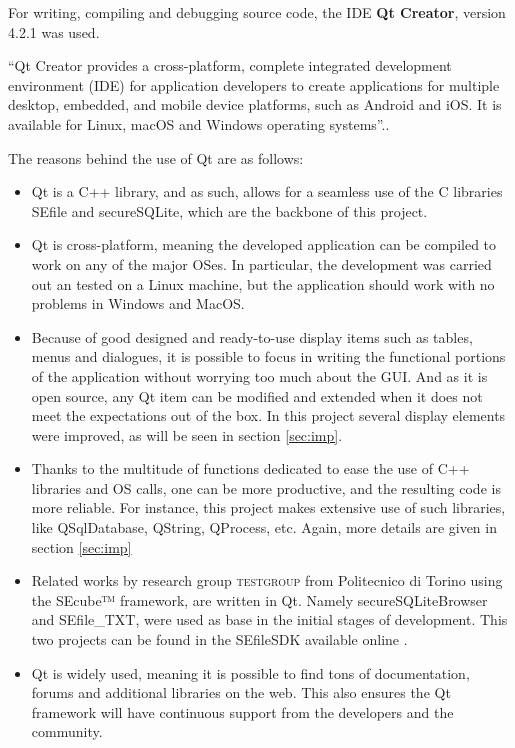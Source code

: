 For writing, compiling and debugging source code, the IDE \textbf{Qt Creator}, version 4.2.1 was used.

``Qt Creator provides a cross-platform, complete integrated development environment (IDE) for application developers to create applications for multiple desktop, embedded, and mobile device platforms, such as Android and iOS. It is available for Linux, macOS and Windows operating systems''.\cite{QtC}.

\vspace{5pt}
The reasons behind the use of Qt are as follows:

\begin{itemize}
\setlength\itemsep{0pt}
\item Qt is a C++ library, and as such, allows for a seamless use of the C libraries SEfile and secureSQLite, which are the backbone of this project.

\item Qt is cross-platform, meaning the developed application can be compiled to work on any of the major OSes. In particular, the development was carried out an tested on a Linux machine, but the application should work with no problems in Windows and MacOS. 

\item Because of good designed and ready-to-use display items such as tables, menus and dialogues, it is possible to focus in writing the functional portions of the application without worrying too much about the GUI. And as it is open source, any Qt item can be modified and extended when it does not meet the expectations out of the box. In this project several display elements were improved, as will be seen in section \ref{sec:imp}.

\item Thanks to the multitude of functions dedicated to ease the use of C++ libraries and OS calls, one can be more productive, and the resulting code is more reliable. For instance, this project makes extensive use of such libraries, like QSqlDatabase, QString, QProcess, etc. Again, more details are given in section \ref{sec:imp}

\item Related works by research group \textsc{testgroup} from Politecnico di Torino using the SEcube™ framework, are written in Qt. Namely secureSQLiteBrowser and SEfile\_TXT, were used as base in the initial stages of development. This two projects can be found in the SEfileSDK available online \cite{SEcubeRes}.

\item Qt is widely used, meaning it is possible to find tons of documentation, forums and additional libraries on the web. This also ensures the Qt framework will have continuous support from the developers and the community.

\end{itemize}



